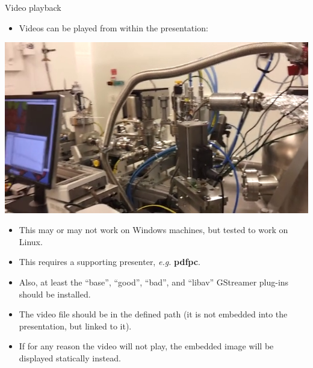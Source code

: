 \documentclass{beamer}
\begin{document}
\begin{frame}[t]{Video playback}

\begin{itemize}
  \item Videos can be played from within the presentation:
\end{itemize}
\begin{center}
  \href{run:ID16A.mp4?autostart&loop}{\includegraphics[height=0.23\textheight]{ID16A_snap}}
\end{center}
\begin{itemize}
  \item This may or may not work on Windows machines, but tested to work on Linux.
  \item This requires a supporting presenter, \emph{e.g.} \textbf{pdfpc}.
  \item Also, at least the ``base'', ``good'', ``bad'', and ``libav'' GStreamer plug-ins should be installed.
  \item The video file should be in the defined path (it is not embedded into the presentation, but linked to it).
  \item If for any reason the video will not play, the embedded image will be displayed statically instead.
\end{itemize}

\end{frame}

\end{document}
